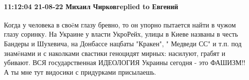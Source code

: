 \paragraph{11:12:04 21-08-22 Михаил Чирковreplied to Евгений}

Когда у человека в своëм глазу бревно, то он упорно пытается найти в чужом глазу соринку.
На Украине у власти УкроРейх, улицы в Киеве названы в честь Бандеры и Шухевича, на Донбассе нацбаты "Кракен", " Медведи СС" и т.п. под знамëнами и с наколками свастики геноцидят мирных: насилуют, грабят и убивают.
ВСЯ государственная ИДЕОЛОГИЯ Украины сегодня - это ФАШИЗМ!!
А ты мне тут видосики с придурками присылаешь.
